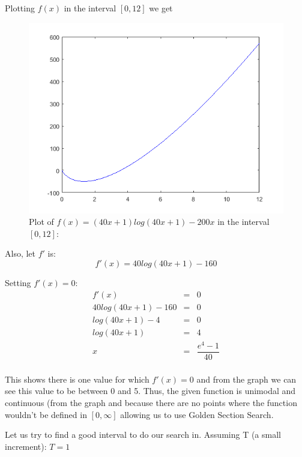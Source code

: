\documentclass[a4paper]{article}
\begin{document}
Plotting $f(x)$ in the interval $[0, 12]$ we get 

\begin{figure}[H]
\begin{center}
\includegraphics[scale=0.75]{problem-2.png}
\end{center}
\caption{Plot of $f(x) = (40x+1) log(40x+1) - 200x$ in the interval $[0, 12]$:}\label{exampleplot}
\end{figure}

Also, let $f'$ is:
\begin{equation}
f'(x) = 40log(40x + 1) - 160
\end{equation}

Setting $f'(x) = 0$:
\begin{eqnarray}
f'(x) &=& 0 \\
40log(40x + 1) - 160 &=& 0 \\
log(40x + 1) - 4 &=& 0 \\
log(40x + 1) &=& 4 \\ 
x &=& \dfrac{e^4 - 1}{40} \\ 
\end{eqnarray}

This shows there is one value for which $f'(x) = 0$ and from the graph we can see this value to be between 0 and 5. Thus, the given function is unimodal and continuous (from the graph and because there are no points where the function wouldn't be defined in $[0, \infty]$ allowing us to use Golden Section Search. 

Let us try to find a good interval to do our search in. Assuming T (a small increment):
$T = 1$
\end{document}
